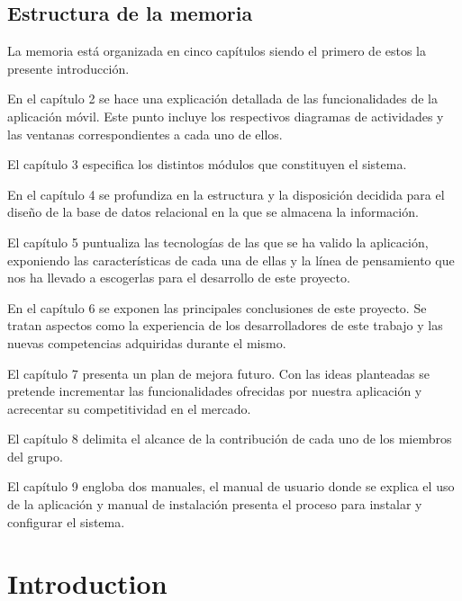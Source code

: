 \documentclass[11pt,spanish,
		listoftables,listoffigures]
		{tfgplantilla}
\begin{document}
\section{Estructura de la memoria}

La memoria está organizada en cinco capítulos siendo el primero de estos la presente introducción.

En el capítulo 2 se hace una explicación detallada de las funcionalidades de la aplicación móvil. Este punto incluye los respectivos diagramas de actividades y las ventanas correspondientes a cada uno de ellos.

El capítulo 3 especifica los distintos módulos que constituyen el sistema. 

En el capítulo 4 se profundiza en la estructura y la disposición decidida para el diseño de la base de datos relacional en la que se almacena la información.

El capítulo 5 puntualiza las tecnologías de las que se ha valido la aplicación, exponiendo las características de cada una de ellas y la línea de pensamiento que nos ha llevado a escogerlas para el desarrollo de este proyecto.

En el capítulo 6 se exponen las principales conclusiones de este proyecto. Se tratan aspectos como la experiencia de los desarrolladores de este trabajo y las nuevas competencias adquiridas durante el mismo.

El capítulo 7 presenta un plan de mejora futuro. Con las ideas planteadas se pretende incrementar las funcionalidades ofrecidas por nuestra aplicación y acrecentar su competitividad en el mercado.

El capítulo 8 delimita el alcance de la contribución de cada uno de los miembros del grupo.

El capítulo 9 engloba dos manuales, el manual de usuario donde se explica el uso de la aplicación y manual de instalación presenta el proceso para instalar y configurar el sistema.

\addtocounter{chapter}{-1}
\chapter{Introduction}
\end{document}
